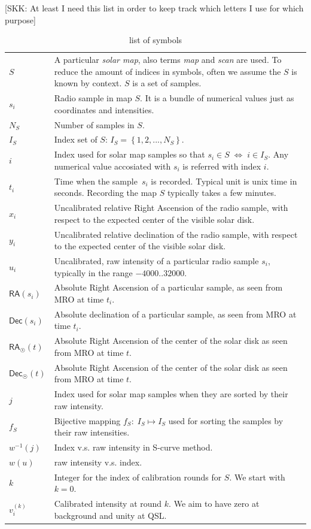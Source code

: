 \documentclass{aa}
\newcommand{\skk}[1]{\textcolor{midorange}{[SKK: #1]}} %
\newcommand{\RA}{{\mathsf{RA}}}
\newcommand{\Dec}{{\mathsf{Dec}}}
\begin{document}
\skk{At least I need this list in order to keep track which letters I use for which purpose}
\begin{table}
    \caption{list of symbols}\label{tab:sym}
    \begin{tabular}{lp{120mm}}
    $S$   & A particular \emph{solar map}, also terms \emph{map} and \emph{scan} are used. To reduce the amount of indices in symbols, often we assume the $S$ is known by context. $S$ is a set of samples. \\
    $s_i$ & Radio sample in map $S$. It is a bundle of numerical values just as coordinates and intensities. \\
    $N_S$ & Number of samples in $S$. \\
    $I_S$ & Index set of $S$: $I_S = \left\{ 1, 2, ..., N_S \right\}$. \\
    $i$   & Index used for solar map samples so that $s_i \in S \; \Leftrightarrow \; i \in I_S$. Any numerical value accosiated with $s_i$ is referred with index $i$. \\
    $t_i$ & Time when the sample $s_i$ is recorded. Typical unit is unix time in seconds. Recording the map $S$ typically takes a few minutes. \\
    $x_i$ & Uncalibrated relative Right Ascension of the radio sample, with respect to the expected center of the visible solar disk. \\
    $y_i$ & Uncalibrated relative declination of the radio sample, with respect to the expected center of the visible solar disk. \\
    $u_i$ & Uncalibrated, raw intensity of a particular radio sample $s_i$, typically in the range $-4000 .. 32000$. \\
    $\RA(s_i)$ & Absolute Right Ascension of a particular sample, as seen from MRO at time $t_i$. \\
    $\Dec(s_i)$ & Absolute declination of a particular sample, as seen from MRO at time $t_i$. \\
    $\RA_{\astrosun}(t)$ & Absolute Right Ascension of the center of the solar disk as seen from MRO at time $t$. \\
    $\Dec_{\astrosun}(t)$ & Absolute Right Ascension of the center of the solar disk as seen from MRO at time $t$. \\
    $j$ & Index used for solar map samples when they are sorted by their raw intensity. \\
    $f_S$ & Bijective mapping $f_S:\; I_S \mapsto I_S$ used for sorting the samples by their raw intensities. \\
    $w^{-1}(j)$ & Index v.s. raw intensity in S-curve method. \\
    $w(u)$ & raw intensity v.s. index. \\
    
    $k$ & Integer for the index of calibration rounds for $S$. We start with $k=0$. \\
    $v_i^{(k)}$ & Calibrated intensity at round $k$. We aim to have zero at background and unity at QSL. \\
    \end{tabular}
\end{table}
\end{document}

